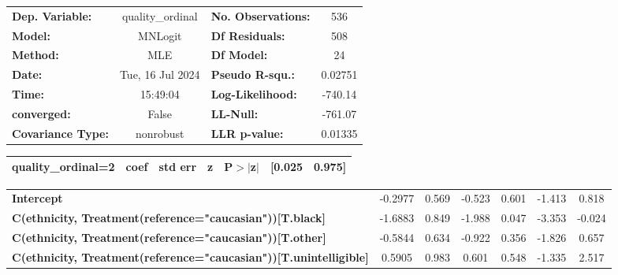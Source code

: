 \begin{center}
\begin{tabular}{lclc}
\toprule
\textbf{Dep. Variable:}                                                   & quality\_ordinal & \textbf{  No. Observations:  } &      536    \\
\textbf{Model:}                                                           &     MNLogit      & \textbf{  Df Residuals:      } &      508    \\
\textbf{Method:}                                                          &       MLE        & \textbf{  Df Model:          } &       24    \\
\textbf{Date:}                                                            & Tue, 16 Jul 2024 & \textbf{  Pseudo R-squ.:     } &  0.02751    \\
\textbf{Time:}                                                            &     15:49:04     & \textbf{  Log-Likelihood:    } &   -740.14   \\
\textbf{converged:}                                                       &      False       & \textbf{  LL-Null:           } &   -761.07   \\
\textbf{Covariance Type:}                                                 &    nonrobust     & \textbf{  LLR p-value:       } &  0.01335    \\
\bottomrule
\end{tabular}
\begin{tabular}{ccccccc}
                       \textbf{quality\_ordinal=2}                        & \textbf{coef} & \textbf{std err} & \textbf{z} & \textbf{P$> |$z$|$} & \textbf{[0.025} & \textbf{0.975]}  \\
\midrule
\bottomrule
\end{tabular}
\begin{tabular}{lcccccc}
\textbf{Intercept}                                                        &      -0.2977  &        0.569     &    -0.523  &         0.601        &       -1.413    &        0.818     \\
\textbf{C(ethnicity, Treatment(reference="caucasian"))[T.black]}          &      -1.6883  &        0.849     &    -1.988  &         0.047        &       -3.353    &       -0.024     \\
\textbf{C(ethnicity, Treatment(reference="caucasian"))[T.other]}          &      -0.5844  &        0.634     &    -0.922  &         0.356        &       -1.826    &        0.657     \\
\textbf{C(ethnicity, Treatment(reference="caucasian"))[T.unintelligible]} &       0.5905  &        0.983     &     0.601  &         0.548        &       -1.335    &        2.517     \\

\end{tabular}
\end{center}
